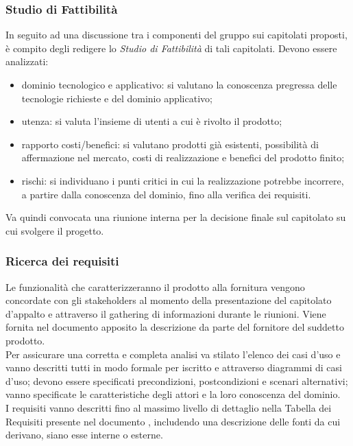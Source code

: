 \subsubsection{Studio di Fattibilità}
In seguito ad una discussione tra i componenti del gruppo sui capitolati proposti, è compito degli \Analisti\space redigere lo \textit{Studio di Fattibilità} di tali capitolati. Devono essere analizzati:
\begin{itemize}
	\item dominio tecnologico e applicativo: si valutano la conoscenza pregressa delle tecnologie richieste e del dominio applicativo;
	\item utenza: si valuta l'insieme di utenti a cui è rivolto il prodotto;
	\item rapporto costi/benefici: si valutano prodotti già esistenti, possibilità di affermazione nel mercato, costi di realizzazione e benefici del prodotto finito;
	\item rischi: si individuano i punti critici in cui la realizzazione potrebbe incorrere, a partire dalla conoscenza del dominio, fino alla verifica dei requisiti.
\end{itemize}
Va quindi convocata una riunione interna per la decisione finale sul capitolato su cui svolgere il progetto.

\subsubsection{Ricerca dei requisiti}
Le funzionalità che caratterizzeranno il prodotto alla fornitura vengono concordate con gli stakeholders al momento della presentazione del capitolato d'appalto e attraverso il gathering di informazioni durante le riunioni. Viene fornita nel documento apposito \AnalisiDeiRequisiti\space la descrizione da parte del fornitore del suddetto prodotto.\\
Per assicurare una corretta e completa analisi va stilato l'elenco dei casi d'uso e vanno descritti tutti in modo formale per iscritto e attraverso diagrammi di casi d'uso; devono essere specificati precondizioni, postcondizioni e scenari alternativi; vanno specificate le caratteristiche degli attori e la loro conoscenza del dominio.\\
I requisiti vanno descritti fino al massimo livello di dettaglio nella Tabella dei Requisiti presente nel documento \AnalisiDeiRequisiti, includendo una descrizione delle fonti da cui derivano, siano esse interne o esterne.

